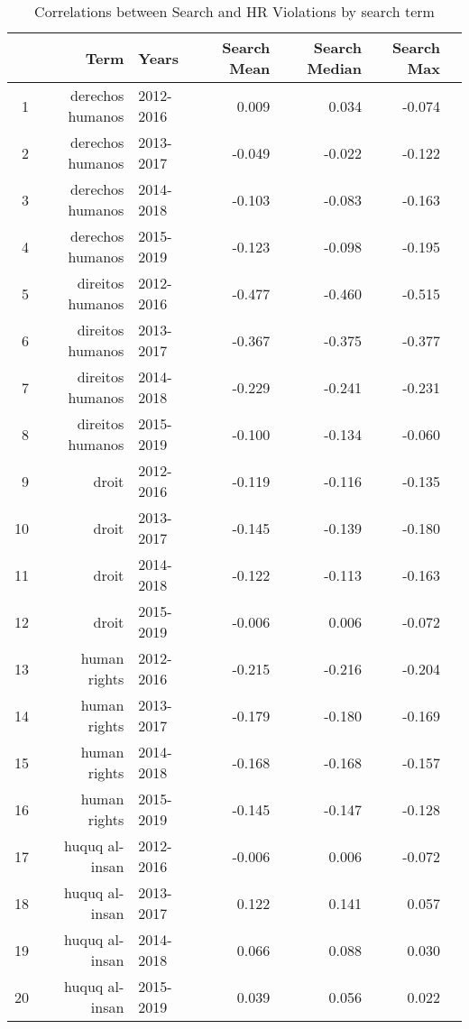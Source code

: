 \begin{table}[ht]
\centering
\begin{tabular}{|r|rlrrrr||}
  \hline
 & Term & Years & Search Mean & Search Median & Search Max \\ 
  \hline
1 & derechos humanos & 2012-2016 & 0.009 & 0.034 & -0.074 \\ 
  2 & derechos humanos & 2013-2017 & -0.049 & -0.022 & -0.122 \\ 
  3 & derechos humanos & 2014-2018 & -0.103 & -0.083 & -0.163 \\ 
  4 & derechos humanos & 2015-2019 & -0.123 & -0.098 & -0.195 \\ 
  5 & direitos humanos & 2012-2016 & -0.477 & -0.460 & -0.515 \\ 
  6 & direitos humanos & 2013-2017 & -0.367 & -0.375 & -0.377 \\ 
  7 & direitos humanos & 2014-2018 & -0.229 & -0.241 & -0.231 \\ 
  8 & direitos humanos & 2015-2019 & -0.100 & -0.134 & -0.060 \\ 
  9 & droit & 2012-2016 & -0.119 & -0.116 & -0.135 \\ 
  10 & droit & 2013-2017 & -0.145 & -0.139 & -0.180 \\ 
  11 & droit & 2014-2018 & -0.122 & -0.113 & -0.163 \\ 
  12 & droit & 2015-2019 & -0.006 & 0.006 & -0.072 \\ 
  13 & human rights & 2012-2016 & -0.215 & -0.216 & -0.204 \\ 
  14 & human rights & 2013-2017 & -0.179 & -0.180 & -0.169 \\ 
  15 & human rights & 2014-2018 & -0.168 & -0.168 & -0.157 \\ 
  16 & human rights & 2015-2019 & -0.145 & -0.147 & -0.128 \\ 
  17 & huquq al-insan & 2012-2016 & -0.006 & 0.006 & -0.072 \\ 
  18 & huquq al-insan & 2013-2017 & 0.122 & 0.141 & 0.057 \\ 
  19 & huquq al-insan & 2014-2018 & 0.066 & 0.088 & 0.030 \\ 
  20 & huquq al-insan & 2015-2019 & 0.039 & 0.056 & 0.022 \\ 
   \hline
\end{tabular}
\caption{Correlations between Search and HR Violations by search term} 
\end{table}
